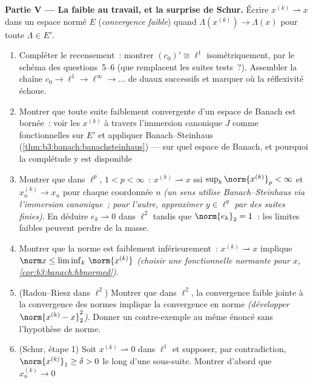 \begin{problem}[{Problème de fin de semaine --- $(\ell^p)' =
\ell^q$, réflexivité, et l'étrangeté de $\ell^\infty$}]
\medskip
\noindent\textbf{Partie V --- La  faible au travail,
et la surprise de Schur.} Écrire $x^{(k)} \rightharpoonup x$
dans un espace normé $E$ (\emph{convergence faible}) quand
$\Lambda(x^{(k)}) \to \Lambda(x)$ pour toute $\Lambda \in
E'$.
\begin{enumerate}[resume]
  \item Compléter le recensement~: montrer $(c_0)' \cong
        \ell^1$ isométriquement, par le schéma des
        questions~5--6 (que remplacent les suites tests~?).
        Assembler la chaîne $c_0 \to \ell^1 \to \ell^\infty
        \to \dots$ de duaux successifs et marquer où la
        réflexivité échoue.
  \item Montrer que toute suite faiblement convergente d'un
        espace de Banach est bornée~: voir les $x^{(k)}$ à
        travers l'immersion canonique $J$ comme
        fonctionnelles sur $E'$ et appliquer
        Banach--Steinhaus (\cref{thm:b3:banach:banachsteinhaus})
        --- sur quel espace de Banach, et pourquoi la
        complétude y est disponible~
  \item Montrer que dans $\ell^p$, $1 < p < \infty$~:
        $x^{(k)} \rightharpoonup x$ ssi
        $\sup_k\norm{x^{(k)}}_p < \infty$ et $x^{(k)}_n \to
        x_n$ pour chaque coordonnée $n$ \emph{(un sens utilise
        Banach--Steinhaus via l'immersion canonique~; pour
        l'autre, approximer $y \in \ell^q$ par des suites
        finies)}. En déduire $e_k \rightharpoonup 0$ dans
        $\ell^2$ tandis que $\norm{e_k}_2 = 1$~: les limites
        faibles peuvent perdre de la masse.
  \item Montrer que la norme est faiblement
         inférieurement~: $x^{(k)}
        \rightharpoonup x$ implique $\norm x \leq
        \liminf_k\,\norm{x^{(k)}}$ \emph{(choisir une
        fonctionnelle normante pour $x$,
        \cref{cor:b3:banach:hbnormed})}.
  \item (Radon--Riesz dans $\ell^2$) Montrer que dans
        $\ell^2$, la convergence faible jointe à la
        convergence des normes implique la convergence en
        norme \emph{(développer $\norm{x^{(k)} - x}_2^2$)}.
        Donner un contre-exemple au même énoncé sans
        l'hypothèse de norme.
  \item (Schur, étape 1) Soit $x^{(k)} \rightharpoonup 0$
        dans $\ell^1$ et supposer, par contradiction,
        $\norm{x^{(k)}}_1 \geq \delta > 0$ le long d'une
        sous-suite. Montrer d'abord que $x^{(k)}_n \to 0$

\end{enumerate}
\end{problem}

